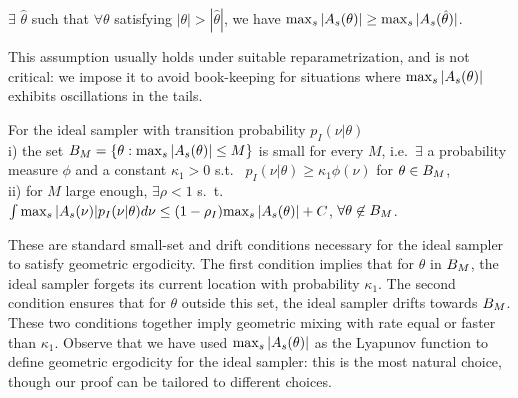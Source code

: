 \begin{assumption}
  $\exists$ $\hat{\theta}$ such that $\forall \theta$ satisfying 
  $|\theta| > |\hat{\theta}|$, we have ${\max_s |A_s(\theta)|} \ge
  {\max_s |A_s(\hat{\theta})|}$.
  \label{asmp:mono_tail}
\end{assumption}
\noindent This assumption usually holds under suitable reparametrization,
and is not critical: we impose it to avoid book-keeping for 
situations where ${\max_s |A_s(\theta)|}$ exhibits oscillations in the tails.

\begin{assumption}
For the ideal sampler with transition probability $p_I(\nu|\theta)$ \\
i) the set $B_M=\{\theta:{\max_s |A_s(\theta)|}\le M \}$ is small for every
$M$, i.e.\ $\exists$ a probability measure $\phi$ and a constant 
$\kappa_1 > 0$ s.t.\ %
$p_I(\nu|\theta) \geq \kappa_1 \phi(\nu)$ for $\theta \in B_M$, \\
ii) for $M$ large enough, $\exists \rho < 1$ s.\ t.\
$\int {\max_s |A_s(\nu)|} p_I(\nu|\theta) d\nu 
\leq (1-\rho_I) {\max_s |A_s(\theta)|}+C$, $\forall \theta \not\in B_M$.
  \label{asmp:ideal_geom}
\end{assumption}
\noindent These are standard small-set and drift conditions necessary
for the ideal sampler to satisfy geometric ergodicity. The first condition
implies that for $\theta$ in $B_M$, %
the ideal sampler forgets its current
location with probability $\kappa_1$. The second condition ensures that
for $\theta$ outside this set, the ideal sampler drifts towards 
$B_M$. These two conditions together imply geometric
mixing with rate equal or faster than $\kappa_1$. Observe that we have
used ${\max_s |A_s(\theta)|}$ as the Lyapunov function to define geometric 
ergodicity for the ideal sampler: this is the most natural choice, though our proof can be
tailored to different choices.

